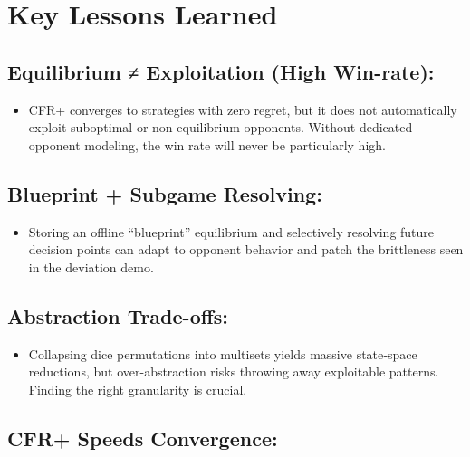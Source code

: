 \documentclass[
]{article}
\begin{document}
\section*{\texorpdfstring{\textbf{Key Lessons
Learned}}{Key Lessons Learned}}\label{key-lessons-learned}

\subsection{Equilibrium ≠ Exploitation (High
Win-rate):}\label{equilibrium-exploitation-high-win-rate}

\begin{itemize}
\item
  CFR+ converges to strategies with zero regret, but it does not
  automatically exploit suboptimal or non-equilibrium opponents. Without
  dedicated opponent modeling, the win rate will never be particularly
  high.
\end{itemize}

\subsection{Blueprint + Subgame
Resolving:}\label{blueprint-subgame-resolving}

\begin{itemize}
\item
  Storing an offline ``blueprint'' equilibrium and selectively resolving
  future decision points can adapt to opponent behavior and patch the
  brittleness seen in the deviation demo.
\end{itemize}

\subsection{Abstraction Trade-offs:}\label{abstraction-trade-offs}

\begin{itemize}
\item
  Collapsing dice permutations into multisets yields massive state‐space
  reductions, but over-abstraction risks throwing away exploitable
  patterns. Finding the right granularity is crucial.
\end{itemize}

\subsection{CFR+ Speeds Convergence:}\label{cfr-speeds-convergence}
\end{document}
